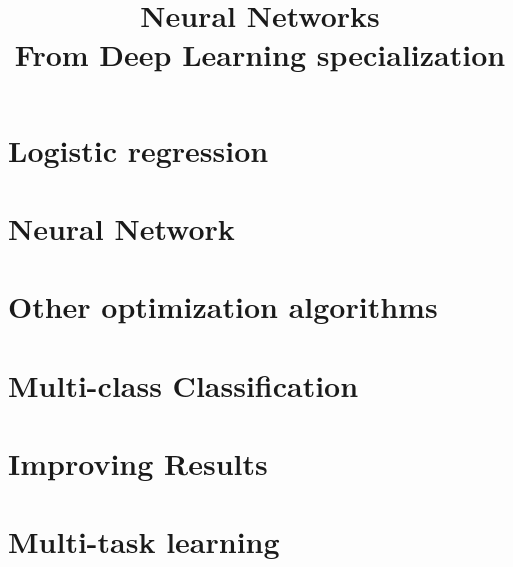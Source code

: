 \documentclass[letter]{article}
\title{Neural Networks\\From Deep Learning specialization}
\begin{document}
\maketitle
	
\section{Logistic regression}
	
	
\section{Neural Network}
	
	
\section{Other optimization algorithms}
	

\section{Multi-class Classification}
	

\section{Improving Results}


\section{Multi-task learning}

	
\end{document}
